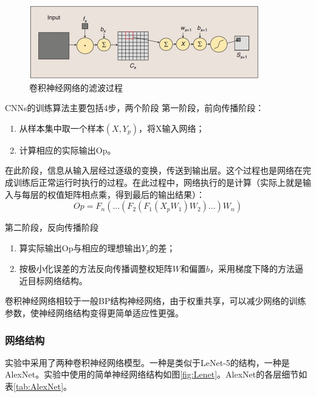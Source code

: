 	\begin{figure}[htbp]
	\centering
	\includegraphics[width=10cm]{resource/CNN_filter.jpg}
	\caption{卷积神经网络的滤波过程}
	\label{fig:CNN_f}
	\end{figure}

	CNNs的训练算法主要包括4步，两个阶段
	第一阶段，前向传播阶段：
	\begin{enumerate}
	\item 从样本集中取一个样本$(X,Y_p)$，将X输入网络；
	\item 计算相应的实际输出Op。
	\end{enumerate}

	在此阶段，信息从输入层经过逐级的变换，传送到输出层。这个过程也是网络在完成训练后正常运行时执行的过程。在此过程中，网络执行的是计算（实际上就是输入与每层的权值矩阵相点乘，得到最后的输出结果）：
	\begin{equation}
	Op=F_n(\dots(F_2(F_1(X_pW_1)W_2)\dots)W_n)
	\end{equation}

	第二阶段，反向传播阶段
	\begin{enumerate}
	\item 算实际输出Op与相应的理想输出$Y_p$的差；
	\item 按极小化误差的方法反向传播调整权矩阵$W$和偏置$b$，采用梯度下降的方法逼近目标网络结构。
	\end{enumerate}

	卷积神经网络相较于一般BP结构神经网络，由于权重共享，可以减少网络的训练参数，使神经网络结构变得更简单适应性更强。

\subsubsection{网络结构}
实验中采用了两种卷积神经网络模型。一种是类似于LeNet-5的结构，一种是AlexNet。实验中使用的简单神经网络结构如图\ref{fig:Lenet}。AlexNet的各层细节如表\ref{tab:AlexNet}。


